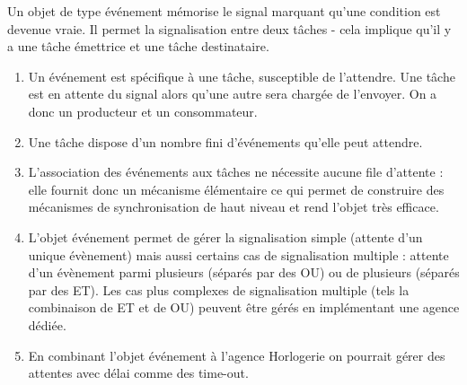 {
Un objet de type événement mémorise le signal marquant qu'une condition 
est devenue vraie. Il permet la signalisation entre deux tâches - cela 
implique qu'il y a une tâche émettrice et une tâche destinataire. 
}

{
\begin{enumerate}
   \item Un événement est spécifique à une tâche, susceptible de l'attendre.
   Une tâche est en attente du signal alors qu'une autre sera chargée de l'envoyer. 
   On a donc un producteur et un consommateur.
   \item Une tâche dispose d'un nombre fini d'événements qu'elle peut
   attendre.
   \item L'association des événements aux tâches ne nécessite aucune file
   d'attente : elle fournit donc un mécanisme élémentaire ce qui permet de 
   construire des mécanismes de synchronisation de haut niveau et rend l'objet très efficace.
   \item L'objet événement permet de gérer la signalisation simple (attente
   d'un unique évènement) mais aussi certains cas de signalisation multiple : attente d'un évènement 
   parmi plusieurs (séparés par des OU) ou de plusieurs (séparés par des ET). 
   Les cas plus complexes de signalisation multiple (tels la combinaison de ET
   et de OU) peuvent être gérés en implémentant une agence dédiée.
   \item En combinant l'objet événement à l'agence Horlogerie on pourrait
   gérer des attentes avec délai comme des time-out.
\end{enumerate}
}
